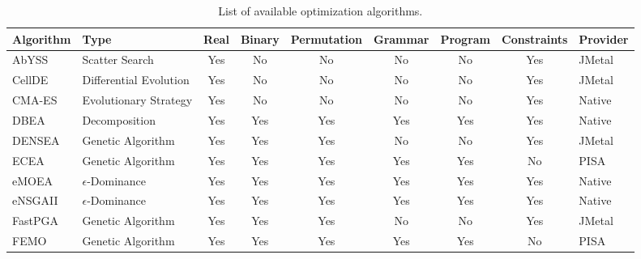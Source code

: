 \begin{sidewaystable}
  \centering
  \caption{List of available optimization algorithms.}
  \label{tbl:algorithms}
  \begin{tabular}{ll|cccccc|l}
  \hline
  Algorithm & Type & Real & Binary & Permutation & Grammar & Program & Constraints & Provider \\
  \hline
  AbYSS & Scatter Search & \cellcolor{green!25}Yes & \cellcolor{red!25}No & \cellcolor{red!25}No & \cellcolor{red!25}No & \cellcolor{red!25}No & \cellcolor{green!25}Yes & JMetal \\
  CellDE & Differential Evolution & \cellcolor{green!25}Yes & \cellcolor{red!25}No & \cellcolor{red!25}No & \cellcolor{red!25}No & \cellcolor{red!25}No & \cellcolor{green!25}Yes & JMetal \\
  CMA-ES & Evolutionary Strategy & \cellcolor{green!25}Yes & \cellcolor{red!25}No & \cellcolor{red!25}No & \cellcolor{red!25}No & \cellcolor{red!25}No & \cellcolor{green!25}Yes & Native \\
  DBEA & Decomposition & \cellcolor{green!25}Yes & \cellcolor{green!25}Yes & \cellcolor{green!25}Yes & \cellcolor{green!25}Yes & \cellcolor{green!25}Yes & \cellcolor{green!25}Yes & Native \\
  DENSEA & Genetic Algorithm & \cellcolor{green!25}Yes & \cellcolor{green!25}Yes & \cellcolor{green!25}Yes & \cellcolor{red!25}No & \cellcolor{red!25}No & \cellcolor{green!25}Yes & JMetal \\
  ECEA & Genetic Algorithm & \cellcolor{green!25}Yes & \cellcolor{green!25}Yes & \cellcolor{green!25}Yes & \cellcolor{green!25}Yes & \cellcolor{green!25}Yes & \cellcolor{red!25}No & PISA \\
  eMOEA & $\epsilon$-Dominance & \cellcolor{green!25}Yes & \cellcolor{green!25}Yes & \cellcolor{green!25}Yes & \cellcolor{green!25}Yes & \cellcolor{green!25}Yes & \cellcolor{green!25}Yes & Native \\
  eNSGAII & $\epsilon$-Dominance & \cellcolor{green!25}Yes & \cellcolor{green!25}Yes & \cellcolor{green!25}Yes & \cellcolor{green!25}Yes & \cellcolor{green!25}Yes & \cellcolor{green!25}Yes & Native \\
  FastPGA & Genetic Algorithm & \cellcolor{green!25}Yes & \cellcolor{green!25}Yes & \cellcolor{green!25}Yes & \cellcolor{red!25}No & \cellcolor{red!25}No & \cellcolor{green!25}Yes & JMetal \\
  FEMO & Genetic Algorithm & \cellcolor{green!25}Yes & \cellcolor{green!25}Yes & \cellcolor{green!25}Yes & \cellcolor{green!25}Yes & \cellcolor{green!25}Yes & \cellcolor{red!25}No & PISA \\

\end{tabular}
\end{sidewaystable}
